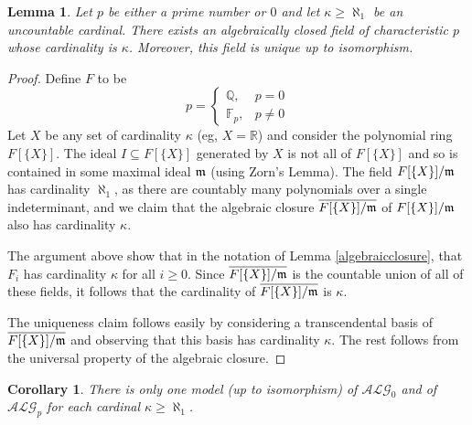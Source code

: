 \documentclass[12pt]{article}
\theoremstyle{plain}
\newtheorem{lemma}[thm]{Lemma}
\newtheorem{cor}[thm]{Corollary}
\theoremstyle{definition}
\newcommand{\bb}[1]{\mathbb{#1}}
\newcommand{\call}[1]{\mathcal{#1}}
\begin{document}
	
	\begin{lemma}
		Let $p$ be either a prime number or $0$ and let $\kappa \geq \aleph_1$ be an uncountable cardinal. There exists an algebraically closed field of characteristic $p$ whose cardinality is $\kappa$. Moreover, this field is unique up to isomorphism.
		\end{lemma}
	\begin{proof}
		Define $F$ to be
		\begin{equation}
			p = \begin{cases}
				\bb{Q},& p = 0\\
				\bb{F}_p, & p \neq 0
				\end{cases}
			\end{equation}
		Let $X$ be any set of cardinality $\kappa$ (eg, $X = \bb{R}$) and consider the polynomial ring $F[\{ X \}]$. The ideal $I \subseteq F[ \{ X \} ]$ generated by $X$ is not all of $F[\{ X \}]$ and so is contained in some maximal ideal $\frak{m}$ (using Zorn's Lemma). The field $F[\{ X \}]/\frak{m}$ has cardinality $\aleph_1$, as there are countably many polynomials over a single indeterminant, and we claim that the algebraic closure $\overline{F[\{ X \}]/\frak{m}}$ of $F[\{ X \}]/\frak{m}$ also has cardinality $\kappa$.
		
		The argument above show that in the notation of Lemma \ref{algebraicclosure}, that $F_i$ has cardinality $\kappa$ for all $i \geq 0$. Since $\overline{F[\{ X \}]/\frak{m}}$ is the countable union of all of these fields, it follows that the cardinality of $\overline{F[\{ X \}]/\frak{m}}$ is $\kappa$.
		
		The uniqueness claim follows easily by considering a transcendental basis of $\overline{F[\{ X \}]/\frak{m}}$ and observing that this basis has cardinality $\kappa$. The rest follows from the universal property of the algebraic closure.
		\end{proof}
	
	\begin{cor}
		There is only one model (up to isomorphism) of $\call{ALG}_0$ and of $\call{ALG}_p$ for each cardinal $\kappa \geq \aleph_1$.
		\end{cor}
	
	
\end{document}
